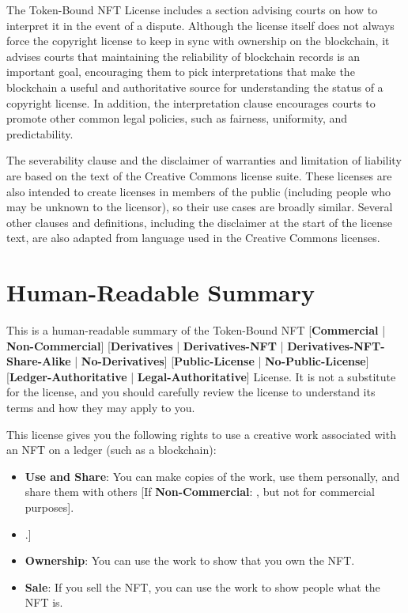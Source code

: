 \documentclass{article}
\newcommand{\iccclicense}{Token-Bound NFT License\xspace}
\newcommand{\keyword}[1]{\textbf{#1}\xspace}
\newcommand{\publiclicense}{\keyword{Public-License}}
\newcommand{\nopubliclicense}{\keyword{No-Public-License}}
\newcommand{\commercial}{\keyword{Commercial}}
\newcommand{\noncommercial}{\keyword{Non-Commercial}}
\newcommand{\noderivative}{\keyword{No-Derivatives}}
\newcommand{\derivative}{\keyword{Derivatives}}
\newcommand{\derivativetracking}{\keyword{Derivatives-NFT}}
\newcommand{\sharealike}{\keyword{Derivatives-NFT-Share-Alike}}
\newcommand{\ledger}{\keyword{Ledger-Authoritative}}
\newcommand{\legal}{\keyword{Legal-Authoritative}}
\newcommand{\iflicenseoption}[2]{[\colorbox{light-gray}{If #1:} #2]}
\newcommand{\ifnotlicenseoption}[2]{[\colorbox{light-gray}{Unless #1:} #2]}
\begin{document}
The \iccclicense includes a section advising courts on how to interpret it in the event of a dispute. Although the license itself does not always force the copyright license to keep in sync with ownership on the blockchain, it advises courts that maintaining the reliability of blockchain records is an important goal, encouraging them to pick interpretations that make the blockchain a useful and authoritative source for understanding the status of a copyright license. In addition, the interpretation clause encourages courts to promote other common legal policies, such as fairness, uniformity, and predictability.

The severability clause and the disclaimer of warranties and limitation of liability are based on the text of the Creative Commons license suite. These licenses are also intended to create licenses in members of the public (including people who may be unknown to the licensor), so their use cases are broadly similar. Several other clauses and definitions, including the disclaimer at the start of the license text, are also adapted from language used in the Creative Commons licenses.

\appendix

\section{Human-Readable Summary}
\label{sec:human}

This is a human-readable summary of the Token-Bound NFT [\commercial{} | \noncommercial{}] [\derivative{} | \derivativetracking{} | \sharealike{} | \noderivative{}]  [\publiclicense{} | \nopubliclicense{}] [\ledger{} | \legal{}] License. It is not a substitute for the license, and you should carefully review the license to understand its terms and how they may apply to you.

This license gives you the following rights to use a creative work associated with an NFT on a ledger (such as a blockchain): 

\begin{itemize}
\item \textbf{Use and Share}: You can make copies of the work, use them personally, and share them with others \iflicenseoption{\noncommercial}{, but not for commercial purposes}.
\item \ifnotlicenseoption{\noderivative}{\textbf{Derivatives}: you can make new works that include and build on the work, use them, and share them with others \iflicenseoption{\noncommercial}{, but not for commercial purposes} \iflicenseoption{\derivativetracking}{, provided that you also release them as NFTs} \iflicenseoption{\sharealike}{, provided that you also release them as NFTs under the same license}.}
\item \textbf{Ownership}: You can use the work to show that you own the NFT.
\item \textbf{Sale}: If you sell the NFT, you can use the work to show people what the NFT is.
\end{itemize}
\end{document}
